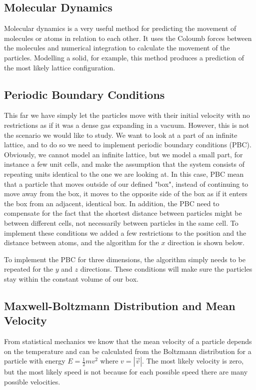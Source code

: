 \documentclass{article}
\begin{document}
\subsection{Molecular Dynamics}
Molecular dynamics is a very useful method for predicting the movement of molecules or atoms in relation to each other. It uses the Coloumb forces between the molecules and numerical integration to calculate the movement of the particles. Modelling a solid, for example, this method produces a prediction of the most likely lattice configuration.

\subsection{Periodic Boundary Conditions}
This far we have simply let the particles move with their initial velocity with no restrictions as if it was a dense gas expanding in a vacuum. However, this is not the scenario we would like to study. We want to look at a part of an infinite lattice, and to do so we need to implement periodic boundary conditions (PBC). Obviously, we cannot model an infinite lattice, but we model a small part, for instance a few unit cells, and make the assumption that the system consists of repeating units identical to the one we are looking at. In this case, PBC mean that a particle that moves outside of our defined "box", instead of continuing to move away from the box, it moves to the opposite side of the box as if it enters the box from an adjacent, identical box. In addition, the PBC need to compensate for the fact that the shortest distance between particles might be between different cells, not necessarily between particles in the same cell. To implement these conditions we added a few restrictions to the position and the distance between atoms, and the algorithm for the $x$ direction is shown below.

\begin{algorithm}[h]
\end{algorithm}
To implement the PBC for three dimensions, the algorithm simply needs to be repeated for the $y$ and $z$ directions. These conditions will make sure the particles stay within the constant volume of our box.


\subsection{Maxwell-Boltzmann Distribution and Mean Velocity}
From statistical mechanics we know that the mean velocity of a particle depends on the temperature and can be calculated from the Boltzmann distribution for a particle with energy $E=\frac{1}{2}mv^2$ where $v=|\vec{v}|$. The most likely velocity is zero, but the most likely speed is not because for each possible speed there are many possible velocities.
\end{document}

